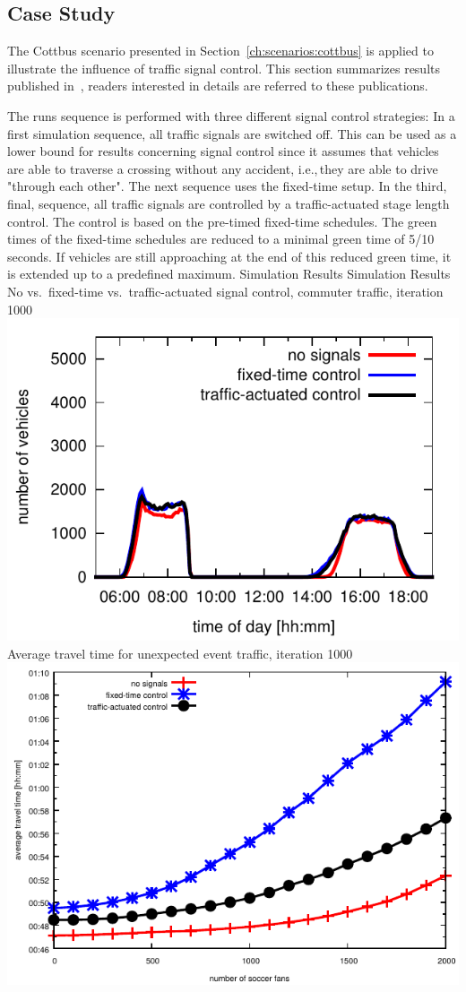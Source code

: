 \subsection{Case Study}
The Cottbus scenario presented in Section~\ref{ch:scenarios:cottbus} is applied to illustrate the influence of traffic signal control. 
This section summarizes results published in~\citet{GretherBischoffNagel2011CottbusSylviaEventAbstract,Grether2014PhD}, readers interested in details are referred to these publications. 

The runs sequence is performed with three different signal control strategies:
In a first simulation sequence, all traffic signals are switched off. This can be used as a lower bound for results concerning signal control since it assumes that vehicles are able to traverse a crossing without any accident, i.e.,\,they are able to drive "through each other". 
The next sequence uses the fixed-time setup. 
In the third, final, sequence, all traffic signals are controlled by a traffic-actuated stage length control. 
The control is based on the pre-timed fixed-time schedules. 
The green times of the fixed-time schedules are reduced to a minimal green time of 5/10\,seconds. 
If vehicles are still approaching at the end of this reduced green time, it is extended up to a predefined maximum. 
%
\createfigure%
{Simulation Results}%
{Simulation Results}%
{\label{fig:results_histogram}}
{%
  \createsubfigure%
  {No vs.~fixed-time vs.~traffic-actuated signal control, commuter traffic, iteration 1000}%
	{\includegraphics[width=0.48\linewidth]{extending/figures/signalslanes/leg_histogram_1292_1293_1291_it_1000.pdf}}
  {\label{fig:commuter_traffic}}%
  \createsubfigure%
	{Average travel time for unexpected event traffic, iteration 1000}
	{\includegraphics[width=0.48\linewidth]{extending/figures/signalslanes/average_travel_time_1220_1222_book.pdf}}
	{\label{fig:unexpected_event}}
}%
{\citet{Grether2014PhD}}

